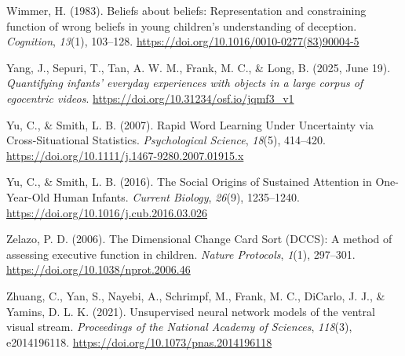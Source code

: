 \documentclass[
  english,
  12pt,
  man,floatsintext]{apa6}
\newlength{\cslhangindent}
\newenvironment{CSLReferences}[2] %
 {\begin{list}{}{%
  \setlength{\itemindent}{0pt}
  \setlength{\leftmargin}{0pt}
  \setlength{\parsep}{0pt}
  \ifodd #1
   \setlength{\leftmargin}{\cslhangindent}
   \setlength{\itemindent}{-1\cslhangindent}
  \fi
  \setlength{\itemsep}{#2\baselineskip}}}
 {\end{list}}
\begin{document}
\begin{CSLReferences}{1}{0}
Wimmer, H. (1983). Beliefs about beliefs: {Representation} and constraining function of wrong beliefs in young children's understanding of deception. \emph{Cognition}, \emph{13}(1), 103--128. \url{https://doi.org/10.1016/0010-0277(83)90004-5}

Yang, J., Sepuri, T., Tan, A. W. M., Frank, M. C., \& Long, B. (2025, June 19). \emph{Quantifying infants' everyday experiences with objects in a large corpus of egocentric videos}. \url{https://doi.org/10.31234/osf.io/jqmf3_v1}

Yu, C., \& Smith, L. B. (2007). Rapid {Word Learning Under Uncertainty} via {Cross-Situational Statistics}. \emph{Psychological Science}, \emph{18}(5), 414--420. \url{https://doi.org/10.1111/j.1467-9280.2007.01915.x}

Yu, C., \& Smith, L. B. (2016). The {Social Origins} of {Sustained Attention} in {One-Year-Old Human Infants}. \emph{Current Biology}, \emph{26}(9), 1235--1240. \url{https://doi.org/10.1016/j.cub.2016.03.026}

Zelazo, P. D. (2006). The {Dimensional Change Card Sort} ({DCCS}): A method of assessing executive function in children. \emph{Nature Protocols}, \emph{1}(1), 297--301. \url{https://doi.org/10.1038/nprot.2006.46}

Zhuang, C., Yan, S., Nayebi, A., Schrimpf, M., Frank, M. C., DiCarlo, J. J., \& Yamins, D. L. K. (2021). Unsupervised neural network models of the ventral visual stream. \emph{Proceedings of the National Academy of Sciences}, \emph{118}(3), e2014196118. \url{https://doi.org/10.1073/pnas.2014196118}

\end{CSLReferences}

\endgroup
\end{document}
